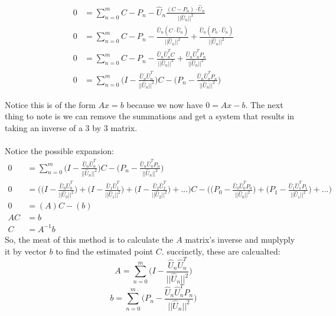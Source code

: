 \begin{align*}
  0 &= \sum_{n=0}^m C - P_n - \hat{U}_n \frac{ (C - P_n) \cdot \hat{U}_n }{ || \hat{U}_n ||^2 }\\
  0 &= \sum_{n=0}^m C - P_n - \frac{ \hat{U}_n ( C \cdot \hat{U}_n ) }{ || \hat{U}_n ||^2 } + \frac{ \hat{U}_n ( P_n \cdot \hat{U}_n ) }{ || \hat{U}_n ||^2 } \\
  0 &= \sum_{n=0}^m C - P_n - \frac{ \hat{U}_n \hat{U}_n^T C }{ || \hat{U}_n ||^2 } + \frac{ \hat{U}_n \hat{U}_n^T P_n }{ || \hat{U}_n ||^2 }\\
  0 &= \sum_{n=0}^m \Big( I -  \frac{ \hat{U}_n \hat{U}_n^T }{ || \hat{U}_n ||^2 }  \Big) C - \Big( P_n - \frac{ \hat{U}_n \hat{U}_n^T P_n }{ || \hat{U}_n ||^2 } \Big)
\end{align*}

Notice this is of the form $Ax = b$ because we now have $0 = Ax - b$. The next
thing to note is we can remove the summations and get a system that results in
taking an inverse of a 3 by 3 matrix.\\
\\
Notice the possible expansion:
\begin{align*}
  0 &= \sum_{n=0}^m \Big( I -  \frac{ \hat{U}_n \hat{U}_n^T }{ || \hat{U}_n ||^2 }  \Big) C - \Big( P_n - \frac{ \hat{U}_n \hat{U}_n^T P_n }{ || \hat{U}_n ||^2 } \Big)\\
  0 &= \Bigg( \Big( I -  \frac{ \hat{U}_0 \hat{U}_0^T }{ || \hat{U}_0 ||^2 }  \Big) + \Big( I -  \frac{ \hat{U}_1 \hat{U}_1^T }{ || \hat{U}_1 ||^2 } \Big) + \Big( I -  \frac{ \hat{U}_2 \hat{U}_2^T }{ || \hat{U}_2 ||^2 } \Big) + ...  \Bigg) C - \Bigg( \Big( P_0 - \frac{ \hat{U}_0 \hat{U}_0^T P_0 }{ || \hat{U}_0 ||^2 } \Big) + \Big( P_1 - \frac{ \hat{U}_1 \hat{U}_1^T P_1 }{ || \hat{U}_1 ||^2 } \Big) + ... \Bigg) \\
  0 &= (A) C - (b)\\
  AC &= b \\
  C &= A^{-1}b
\end{align*}
So, the meat of this method is to calculate the $A$ matrix's inverse and muplyply
it by vector $b$ to find the estimated point $C$. succinctly, these are calcualted:
\[
A = \sum_{n=0}^m \Big( I -  \frac{ \hat{U}_n \hat{U}_n^T }{ || \hat{U}_n ||^2 } \Big)
\]
\[
b = \sum_{n=0}^m \Big( P_n - \frac{ \hat{U}_n \hat{U}_n^T P_n }{ || \hat{U}_n ||^2 } \Big)
\]

























